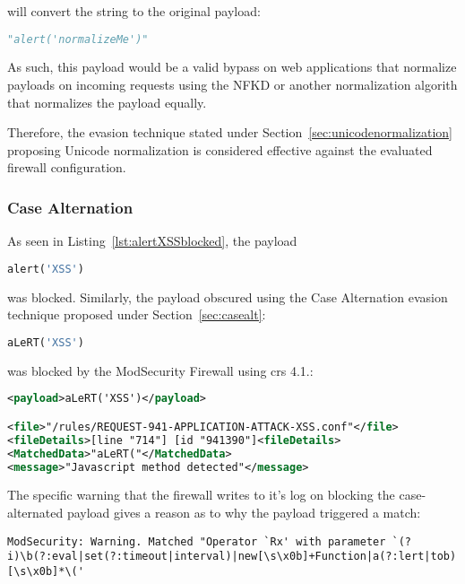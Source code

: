 will convert the string to the original payload:

\begin{lstlisting}[style=basicStyle, language=Python]
"alert('normalizeMe')"
\end{lstlisting}

As such, this payload would be a valid bypass on web applications that normalize payloads on incoming requests using the NFKD or another normalization algorith that normalizes the payload equally. 

Therefore, the evasion technique stated under Section~\ref{sec:unicodenormalization} proposing Unicode normalization is considered effective against the evaluated firewall configuration.


\subsubsection{Case Alternation}
\label{sec:casealternationevaluation}
As seen in Listing~\ref{lst:alertXSSblocked}, the payload 

\begin{lstlisting}[style=basicStyle, language=Python]
alert('XSS')
\end{lstlisting}

was blocked. Similarly, the payload obscured using the Case Alternation evasion technique proposed under Section~\ref{sec:casealt}:

\begin{lstlisting}[style=basicStyle, language=Python]
aLeRT('XSS')
\end{lstlisting}

was blocked by the ModSecurity Firewall using \acrshort{crs} 4.1.:

\begin{lstlisting}[style=ruleStyle, language=XML, caption=aLeRT('XSS') blocked, label=lst:alertcasealternationblocked]
<payload>aLeRT('XSS')</payload>

<file>"/rules/REQUEST-941-APPLICATION-ATTACK-XSS.conf"</file>
<fileDetails>[line "714"] [id "941390"]<fileDetails>
<MatchedData>"aLeRT("</MatchedData>
<message>"Javascript method detected"</message>
\end{lstlisting}

The specific warning that the firewall writes to it's log on blocking the case-alternated payload gives a reason as to why the payload triggered a match:

\begin{lstlisting}[style=basicStyle, caption=ModSecurity warning on case alternated payloads, label={lst:modsecwarning}]
ModSecurity: Warning. Matched "Operator `Rx' with parameter `(?i)\b(?:eval|set(?:timeout|interval)|new[\s\x0b]+Function|a(?:lert|tob)|btoa|prompt|confirm)[\s\x0b]*\('
\end{lstlisting}

